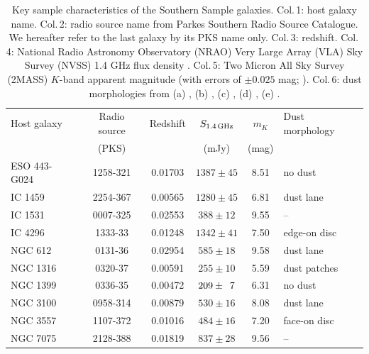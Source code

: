 \documentclass[a4paper,fleqn,usenatbib]{mnras}
\begin{document}
	\begin{table}
		\centering
		\caption{Key sample characteristics of the Southern Sample galaxies. Col.\,1: host galaxy name. Col.\,2: radio source name from Parkes Southern Radio Source Catalogue. We hereafter refer to the last galaxy by its PKS name only. Col.\,3: redshift. Col.\,4: National Radio Astronomy Observatory (NRAO) Very Large Array (VLA) Sky Survey (NVSS) 1.4 GHz flux density \citep{Condon1998}. Col.\,5: Two Micron All Sky Survey (2MASS) $K$-band apparent magnitude (with errors of $\pm 0.025$ mag; \citealt{Skrutskie2006}). Col.\,6: dust morphologies from (a) \citet{Govoni2000}, (b) \citet{Lauer2005}, (c) \citet{Bettoni2001}, (d) \citet{Sandage1979}, (e) \citet{Colbert2001}.}
		\label{tab:sample}
		\begin{tabular}{l c c c c l}
			\hline
			\hline
			Host galaxy	& Radio source 	& Redshift	& $S_\text{1.4\,GHz}$	& $m_K$ & Dust morphology\\
						& (PKS) 		& 			& (mJy) 			& (mag)	&\\
			\hline 
			ESO 443-G024 & 1258-321 	& 0.01703	& $1387 \pm 45$		& 8.51 & no dust\tnote{a}	\\ 
			IC 1459 	& 2254-367 		& 0.00565 	& $1280 \pm 45$		& 6.81 & dust lane\tnote{b}	\\
			IC 1531 	& 0007-325 		& 0.02553 	& \leavevmode\phantom{0}$388 \pm 12$		& 9.55 & --					\\
			IC 4296		& 1333-\leavevmode\phantom{0}33 		& 0.01248 	& $1342 \pm 41$		& 7.50 & edge-on disc\tnote{b} \\
			NGC 612 	& 0131-\leavevmode\phantom{0}36 		& 0.02954 	& \leavevmode\phantom{0}$585 \pm 18$		& 9.58 & dust lane\tnote{c}	\\
			NGC 1316 	& 0320-\leavevmode\phantom{0}37 & 0.00591 	& \leavevmode\phantom{0}$255 \pm 10$		& 5.59 & dust patches\tnote{b} \\
			NGC 1399 	& 0336-\leavevmode\phantom{0}35 & 0.00472 	& \leavevmode\phantom{0}$209 \pm \leavevmode\phantom{0}7$	& 6.31 & no dust\tnote{b}	\\
			NGC 3100 	& 0958-314 		& 0.00879 	& \leavevmode\phantom{0}$530 \pm 16$		& 8.08 & dust lane\tnote{d}	\\
			NGC 3557 	& 1107-372 		& 0.01016 	& \leavevmode\phantom{0}$484 \pm 16$		& 7.20 & face-on disc\tnote{b}\\
			NGC 7075 	& 2128-388 		& 0.01819 	& \leavevmode\phantom{0}$837 \pm 28$		& 9.56 & --					\\

\end{tabular}
\end{table}
\end{document}
